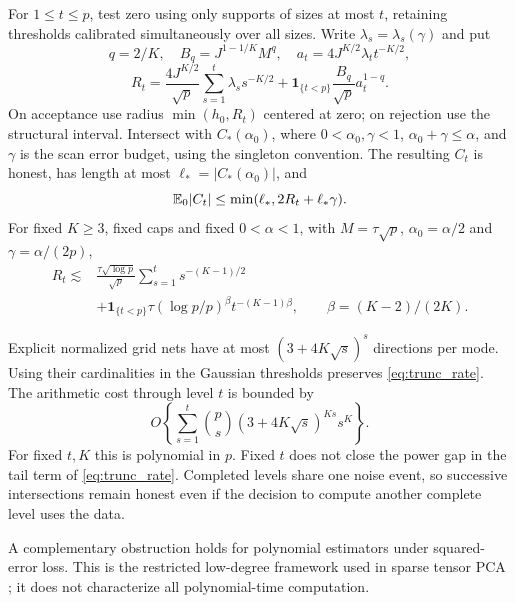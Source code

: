 \begin{proposition}\label{prop:truncated}
For $1\le t\le p$, test zero using only supports of sizes at most $t$, retaining thresholds calibrated simultaneously over all sizes. Write $\lambda_s=\lambda_s(\gamma)$ and put
\[
 q=2/K,\quad B_q=J^{1-1/K}M^q,\quad
 a_t=4J^{K/2}\lambda_t t^{-K/2},
\]
\[
 R_t=\frac{4J^{K/2}}{\sqrt p}\sum_{s=1}^t\lambda_s s^{-K/2}
       +\mathbf1_{\{t<p\}}\frac{B_q}{\sqrt p}a_t^{1-q}.
\]
On acceptance use radius $\min(h_0,R_t)$ centered at zero; on rejection use the structural interval.
Intersect with $C_*(\alpha_0)$, where $0<\alpha_0,\gamma<1$,
$\alpha_0+\gamma\le\alpha$, and $\gamma$ is the scan error budget, using the singleton convention.
The resulting $C_t$ is honest, has length at most $\ell_*=|C_*(\alpha_0)|$, and
\[
 \mathbb E_0|C_t|\le\min(\ell_*,2R_t+\ell_*\gamma).
\]
For fixed $K\ge3$, fixed caps and fixed $0<\alpha<1$, with $M=\tau\sqrt p$, $\alpha_0=\alpha/2$ and $\gamma=\alpha/(2p)$,
\begin{align}\label{eq:trunc_rate}
 R_t\lesssim{}&
 \frac{\tau\sqrt{\log p}}{\sqrt p}
       \sum_{s=1}^t s^{-(K-1)/2}\\
 &+\mathbf1_{\{t<p\}}\tau(\log p/p)^\beta
                t^{-(K-1)\beta},\qquad
 \beta=(K-2)/(2K).\nonumber
\end{align}
\end{proposition}

Explicit normalized grid nets have at most $(3+4K\sqrt s)^s$ directions per mode.
Using their cardinalities in the Gaussian thresholds preserves \eqref{eq:trunc_rate}.
The arithmetic cost through level $t$ is bounded by
\[
 O\left\{\sum_{s=1}^t\binom ps
             (3+4K\sqrt s)^{Ks}s^K\right\}.
\]
For fixed $t,K$ this is polynomial in $p$. Fixed $t$ does not close the power gap in the tail term of \eqref{eq:trunc_rate}. Completed levels share one noise event, so successive intersections remain honest even if the decision to compute another complete level uses the data.

A complementary obstruction holds for polynomial estimators under squared-error loss. This is the restricted low-degree framework used in sparse tensor PCA \citep{choo2021,fu2026}; it does not characterize all polynomial-time computation.

